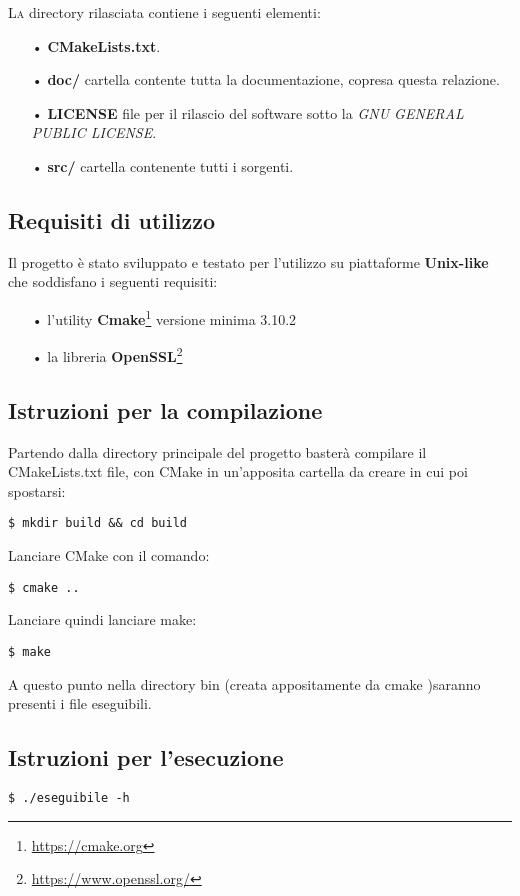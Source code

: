 \lettrine{L}{a} directory rilasciata contiene i seguenti elementi:
\begin{itemize}
\item[•] \textbf{CMakeLists.txt}.
\item[•] \textbf{doc/} cartella contente tutta la documentazione, copresa questa relazione.
\item[•] \textbf{LICENSE} file per il rilascio del software sotto la \textit{GNU GENERAL PUBLIC LICENSE}.
\item[•] \textbf{src/} cartella contenente tutti i sorgenti.
\end{itemize}

\subsection{Requisiti di utilizzo}
Il progetto è stato sviluppato e testato per l'utilizzo su piattaforme \textbf{Unix-like} che soddisfano i seguenti requisiti:

\begin{itemize}
\item[•]l'utility \textbf{Cmake}\footnote{\url{https://cmake.org}} versione minima 3.10.2
\item[•]la libreria \textbf{OpenSSL}\footnote{\url{https://www.openssl.org/}}
\end{itemize}

\subsection{Istruzioni per la compilazione}
Partendo dalla directory principale del progetto basterà compilare il CMakeLists.txt file, con CMake in un'apposita cartella da creare in cui poi spostarsi:

\begin{lstlisting}
$ mkdir build && cd build
\end{lstlisting}

Lanciare CMake con il comando:
\begin{lstlisting}
$ cmake ..
\end{lstlisting}

Lanciare quindi lanciare make:

\begin{lstlisting}
$ make
\end{lstlisting}

A questo punto nella directory bin (creata appositamente da cmake )saranno presenti i file eseguibili.

\subsection{Istruzioni per l'esecuzione}
\begin{lstlisting}
$ ./eseguibile -h
\end{lstlisting}

